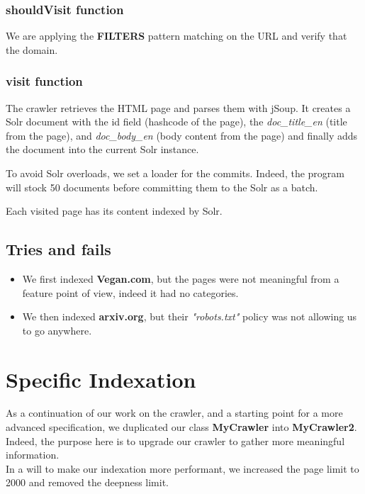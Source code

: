 \documentclass[a4paper]{article}
\begin{document}
\subsubsection{shouldVisit function}
We are applying the \textbf{FILTERS} pattern matching on the URL and verify that the domain.

\subsubsection{visit function}

The crawler retrieves the HTML page and parses them with jSoup. It creates a Solr document with the id field (hashcode of the page), the \textit{doc\_title\_en} (title from the page), and \textit{doc\_body\_en} (body content from the page) and finally adds the document into the current Solr instance.

To avoid Solr overloads, we set a loader for the commits. Indeed, the program will stock 50 documents before committing them to the Solr as a batch.

Each visited page has its content indexed by Solr.

\subsection{Tries and fails}
\begin{itemize}  
\item We first indexed \textbf{Vegan.com}, but the pages were not meaningful from a feature point of view, indeed it had no categories.
\item We then indexed  \textbf{arxiv.org}, but their \textit{"robots.txt"} policy was not allowing us to go anywhere.
\end{itemize}

\section{Specific Indexation}
As a continuation of our work on the crawler, and a starting point for a more advanced specification, we duplicated our class \textbf{MyCrawler} into \textbf{MyCrawler2}. Indeed, the purpose here is to upgrade our crawler to gather more meaningful information.\\

In a will to make our indexation more performant, we increased the page limit to 2000 and removed the deepness limit.
\end{document}
